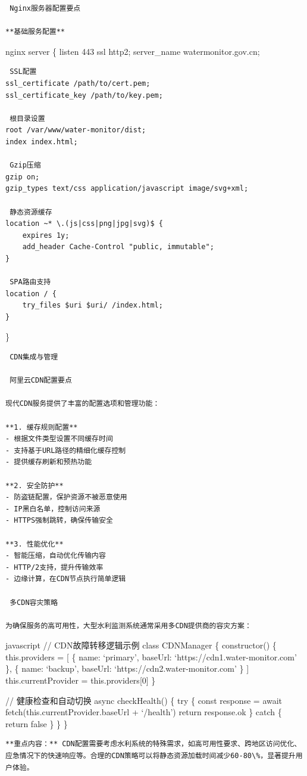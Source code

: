 {{\begin{lstlisting}
 Nginx服务器配置要点

**基础服务配置**
\end{lstlisting}

nginx server \{ listen 443 ssl http2; server\_name watermonitor.gov.cn;

\begin{verbatim}
 SSL配置
ssl_certificate /path/to/cert.pem;
ssl_certificate_key /path/to/key.pem;

 根目录设置
root /var/www/water-monitor/dist;
index index.html;

 Gzip压缩
gzip on;
gzip_types text/css application/javascript image/svg+xml;

 静态资源缓存
location ~* \.(js|css|png|jpg|svg)$ {
    expires 1y;
    add_header Cache-Control "public, immutable";
}

 SPA路由支持
location / {
    try_files $uri $uri/ /index.html;
}
\end{verbatim}

\}

\begin{lstlisting}
 CDN集成与管理

 阿里云CDN配置要点

现代CDN服务提供了丰富的配置选项和管理功能：

**1. 缓存规则配置**
- 根据文件类型设置不同缓存时间
- 支持基于URL路径的精细化缓存控制
- 提供缓存刷新和预热功能

**2. 安全防护**
- 防盗链配置，保护资源不被恶意使用
- IP黑白名单，控制访问来源
- HTTPS强制跳转，确保传输安全

**3. 性能优化**
- 智能压缩，自动优化传输内容
- HTTP/2支持，提升传输效率
- 边缘计算，在CDN节点执行简单逻辑

 多CDN容灾策略

为确保服务的高可用性，大型水利监测系统通常采用多CDN提供商的容灾方案：
\end{lstlisting}

javascript // CDN故障转移逻辑示例 class CDNManager \{ constructor() \{ this.providers = {[} \{ name: `primary', baseUrl: `https://cdn1.water-monitor.com' \}, \{ name: `backup', baseUrl: `https://cdn2.water-monitor.com' \} {]} this.currentProvider = this.providers{[}0{]} \}

// 健康检查和自动切换 async checkHealth() \{ try \{ const response = await fetch(this.currentProvider.baseUrl + `/health') return response.ok \} catch \{ return false \} \} \}

\begin{lstlisting}
**重点内容：** CDN配置需要考虑水利系统的特殊需求，如高可用性要求、跨地区访问优化、应急情况下的快速响应等。合理的CDN策略可以将静态资源加载时间减少60-80\%，显著提升用户体验。


\end{lstlisting}}}
